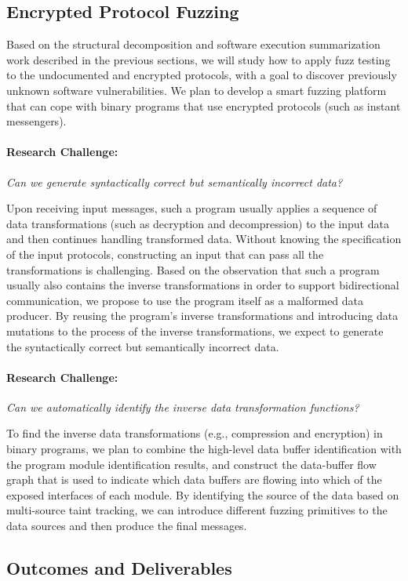 \documentclass[letterpaper,twoside,11pt,headings=small]{scrartcl}
\newcommand{\challenge}[1]{\paragraph{Research Challenge:} \emph{#1}}
\begin{document}
\subsection{Encrypted Protocol Fuzzing}
\label{sec:overview:fuzzing}

Based on the structural decomposition and software execution summarization work
described in the previous sections, we will study how to apply fuzz testing to
the undocumented and encrypted protocols, with a goal to discover previously
unknown software vulnerabilities.  We plan to develop a smart fuzzing platform
that can cope with binary programs that use encrypted protocols (such as instant messengers).

\challenge{Can we generate syntactically correct but semantically incorrect data?}

Upon receiving input messages, such a program usually applies a sequence of data
transformations (such as decryption and decompression) to the input data and then
continues handling transformed data. Without knowing the specification of the input protocols,
constructing an input that can pass all the transformations is challenging.
Based on the observation that such a program usually also contains the inverse transformations
in order to support bidirectional communication, we propose to use the program
itself as a malformed data producer. By reusing the program's inverse transformations
and introducing data mutations to the process of the inverse transformations,
we expect to generate the syntactically correct but semantically incorrect data.

\challenge{Can we automatically identify the inverse data transformation functions?}

To find the inverse data transformations (e.g., compression and encryption) in binary programs,
we plan to combine the high-level data buffer identification with the program module identification results,
and construct the data-buffer flow graph that is used to indicate which data buffers are flowing into which of
the exposed interfaces of each module. By identifying the source of the data based on
multi-source taint tracking, we can introduce different fuzzing primitives to the data sources and then produce the final messages.

\subsection{Outcomes and Deliverables}
\label{sec:overview:outcomes}
\end{document}
